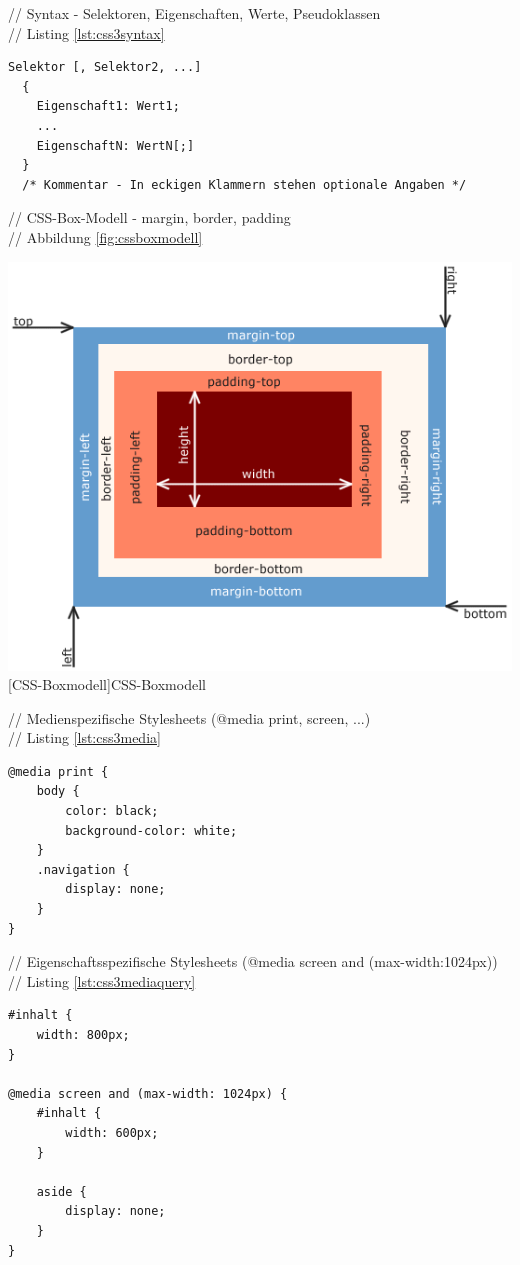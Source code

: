 \documentclass[12pt,a4paper,bibliography=totocnumbered,listof=totocnumbered]{scrartcl}
\begin{document}
// Syntax - Selektoren, Eigenschaften, Werte, Pseudoklassen\\
// Listing \ref{lst:css3syntax}
	\vspace{1em}
	\begin{lstlisting}[caption=CSS3 Syntax Beispiel, label=lst:css3syntax]
Selektor [, Selektor2, ...]
  {
    Eigenschaft1: Wert1;
    ...
    EigenschaftN: WertN[;]
  }
  /* Kommentar - In eckigen Klammern stehen optionale Angaben */
	\end{lstlisting}

// CSS-Box-Modell - margin, border, padding\\
// Abbildung \ref{fig:cssboxmodell}\\
	\vspace{1em}
	\begin{minipage}{\linewidth}
		\centering
		\includegraphics[width=0.7\linewidth]{images/css_boxmodell.png}
		[CSS-Boxmodell]{CSS-Boxmodell\footnotemark }
		\label{fig:cssboxmodell}
	\end{minipage}
	
// Medienspezifische Stylesheets (@media print, screen, ...)\\
// Listing \ref{lst:css3media}
	\vspace{1em}
	\begin{lstlisting}[caption=CSS3 medienspezifisches Stylesheet, label=lst:css3media]
@media print {
	body {
		color: black;
		background-color: white;
	}
	.navigation {
		display: none;
	}
}
	\end{lstlisting}

// Eigenschaftsspezifische Stylesheets (@media screen and (max-width:1024px))\\
// Listing \ref{lst:css3mediaquery}
	\vspace{1em}
	\begin{lstlisting}[caption=CSS3 eigenschaftsspezifisches Stylesheet, label=lst:css3mediaquery]
#inhalt {
	width: 800px;
}
 
@media screen and (max-width: 1024px) {
	#inhalt {
		width: 600px;
	}
 
	aside {
		display: none;
	}
}
	\end{lstlisting}
\end{document}
